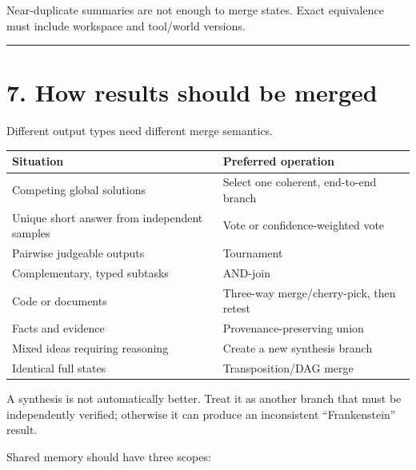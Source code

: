 \documentclass[
  letterpaper,
]{article}
\newcounter{none} %
\begin{document}
Near-duplicate summaries are not enough to merge states. Exact equivalence must include workspace and tool/world versions.

\begin{center}\rule{0.5\linewidth}{0.5pt}\end{center}

\section{7. How results should be merged}\label{how-results-should-be-merged}

Different output types need different merge semantics.

{\def\LTcaptype{none} %
\begin{longtable}[]{@{}
  >{\raggedright\arraybackslash}p{}
  >{\raggedright\arraybackslash}p{}@{}}
\toprule\noalign{}
\begin{minipage}[b]{\linewidth}\raggedright
Situation
\end{minipage} & \begin{minipage}[b]{\linewidth}\raggedright
Preferred operation
\end{minipage} \\
\midrule\noalign{}
\endhead
\bottomrule\noalign{}
\endlastfoot
Competing global solutions & Select one coherent, end-to-end branch \\
Unique short answer from independent samples & Vote or confidence-weighted vote \\
Pairwise judgeable outputs & Tournament \\
Complementary, typed subtasks & AND-join \\
Code or documents & Three-way merge/cherry-pick, then retest \\
Facts and evidence & Provenance-preserving union \\
Mixed ideas requiring reasoning & Create a new synthesis branch \\
Identical full states & Transposition/DAG merge \\
\end{longtable}
}

A synthesis is not automatically better. Treat it as another branch that must be independently verified; otherwise it can produce an inconsistent ``Frankenstein'' result.

Shared memory should have three scopes:
\end{document}
